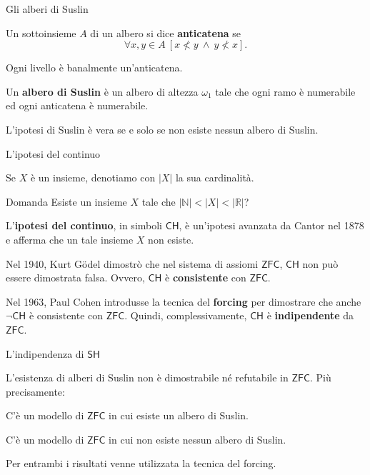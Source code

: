 \documentclass{beamer}
\theoremstyle{num.custom-title}
\theoremstyle{custom-title}
\newcommand{\ZFC}{\ensuremath{\mathsf{ZFC}}\xspace}
\newcommand{\CH}{\ensuremath{\mathsf{CH}}\xspace}
\newcommand{\SH}{\ensuremath{\mathsf{SH}}\xspace}
\newcommand{\N}{\mathbb{N}}
\newcommand{\R}{\mathbb{R}}
\renewcommand{\emph}[1]{\textbf{#1}}
\begin{document}
\begin{frame}{Gli alberi di Suslin}

\begin{definition}
Un sottoinsieme $A$ di un albero si dice \emph{anticatena} se 
\[
\forall x,y \in A \ [x \nless y \ \wedge \ y \nless x].
\]
\end{definition}

Ogni livello è banalmente un'anticatena.

\pause

\begin{definition}
Un \emph{albero di Suslin} è un albero di altezza $\omega_1$ tale che ogni ramo è numerabile ed ogni anticatena è numerabile.
\end{definition}

\pause

\begin{theorem}[Kurepa, 1935]
L'ipotesi di Suslin è vera se e solo se non esiste nessun albero di Suslin.
\end{theorem}

\end{frame}


\begin{frame}{L'ipotesi del continuo}

Se $X$ è un insieme, denotiamo con $|X|$ la sua cardinalità.

\begin{exampleblock}{Domanda}
Esiste un insieme $X$ tale che $|\N| < |X| < |\R|$?
\end{exampleblock}

\pause

L'\emph{ipotesi del continuo}, in simboli \CH, è un'ipotesi avanzata da Cantor nel 1878 e afferma che un tale insieme $X$ non esiste.

\pause

Nel 1940, Kurt Gödel dimostrò che nel sistema di assiomi \ZFC, \CH non può essere dimostrata falsa. Ovvero, \CH è \emph{consistente} con \ZFC.

\pause

Nel 1963, Paul Cohen introdusse la tecnica del \emph{forcing} per dimostrare che anche $\neg\CH$ è consistente con \ZFC. Quindi, complessivamente, \CH è \emph{indipendente} da \ZFC.

\end{frame}


\begin{frame}{L'indipendenza di \SH}

L'esistenza di alberi di Suslin non è dimostrabile né refutabile in \ZFC. Più precisamente:

\begin{theorem}[Tennenbaum, 1963]
C'è un modello di \ZFC in cui esiste un albero di Suslin.
\end{theorem}

\begin{theorem}
C'è un modello di \ZFC in cui non esiste nessun albero di Suslin.
\end{theorem}

Per entrambi i risultati venne utilizzata la tecnica del forcing.

\end{frame}
\end{document}
